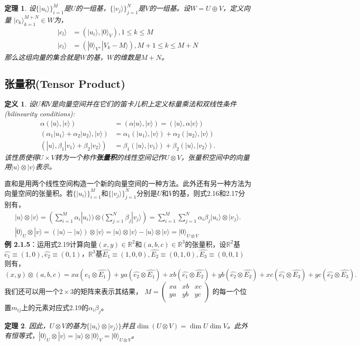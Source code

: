 \documentclass[mathserif,hyperref,UTF8,openany,b5paper]{ctexbook}
\newtheorem{defn}{定义}[section]
\newtheorem{thm}{定理}[section]
\begin{document}
\begin{thm}
设$\{|u_i\rangle\}^M_{i=1}$是$U$的一组基，$\{|v_j \rangle\}^N_{j=1}$是$V$的一组基。设$W = U\oplus V$，定义向量
${|c_k\rangle}^{M+N}_{k=1}\in W$为，
\begin{align}
    |c_l\rangle &= (|u_i\rangle,|0\rangle_V),1\leq k\leq M\\
    |c_l\rangle &= (|0\rangle_V,|V_k-M\rangle),M+1\leq k\leq M+N
\end{align}
那么这组向量的集合就是$W$的基，$W$的维数是$M + N$。
\end{thm}
\subsection{张量积(Tensor Product)}
\begin{defn}
设$U$和$V$是向量空间并在它们的笛卡儿积上定义标量乘法和双线性条件(bilinearity conditions):
\begin{align}
\alpha(|u\rangle,|v\rangle)&=(\alpha|u\rangle,|v\rangle)=(|u\rangle,\alpha|v\rangle)\\
(\alpha_1|u_1\rangle+\alpha_2|u_2\rangle,|v\rangle)&=\alpha_1(|u_1\rangle,|v\rangle)+\alpha_2(|u_2\rangle,|v\rangle)\\
(|u\rangle,\beta_1|v_1\rangle+\beta_2|v_2\rangle)&=\beta_1(|u\rangle,|v_1\rangle)+\beta_2(|u\rangle,
|v_2\rangle).
\end{align}
该性质使得$U\times V$转为一个称作\textbf{张量积}的线性空间记作$U\otimes V$，张量积空间中的向量用$|u\rangle \otimes |v \rangle$表示。
\end{defn}
直和是用两个线性空间构造一个新的向量空间的一种方法。此外还有另一种方法为向量空间的张量积。若$\{|u_i\rangle\}^M_{i=1}$和$\{|v_j\rangle\}^N_{j=1}$分别是$U$和$V$的基，则式2.16和2.17分别有，
\begin{align}
    |u\rangle \otimes |v \rangle = (\sum^M_{i=1}\alpha_i|u_i\rangle)\otimes(\sum^N_{j=1}\beta_j|v_j\rangle)=\sum^M_{i=1}\sum^N_{j=1}\alpha_i\beta_j|u_i\rangle\otimes|v_j\rangle.\\
    |0\rangle_U \otimes |v\rangle = (|u\rangle-|u\rangle)\otimes|v\rangle=|u\rangle\otimes|v\rangle-|u\rangle\otimes|v\rangle=|0\rangle_{U\otimes V}
\end{align}
\textbf{例 2.1.5}：运用式2.19计算向量$(x,y)\in\mathbb{R}^2$和$(a,b,c)\in\mathbb{R}^3$的张量积，设$\mathbb{R}^2$基$\hat{e_1}\equiv(1,0),\hat{e_2}\equiv(0,1)$，$\mathbb{R}^3$基$\hat{E_1}\equiv(1,0,0),\hat{E_2}\equiv(0,1,0),\hat{E_3}\equiv(0,0,1)$则有，
$(x,y)\otimes (a,b,c)=xa(\hat{e_1}\otimes\hat{E_1})+ya(\hat{e_2}\otimes\hat{E_1})+xb(\hat{e_1}\otimes\hat{E_2})+yb(\hat{e_2}\otimes\hat{E_2})+xc(\hat{e_1}\otimes\hat{E_3})+yc(\hat{e_2}\otimes\hat{E_3}).$
我们还可以用一个$2\times 3$的矩阵来表示其结果，
$M=\begin{pmatrix}
xa&xb&xc\\
ya&yb&yc\\
\end{pmatrix}$
的每一个位置$m_{ij}$上的元素对应式2.19的$\alpha_i\beta_j$。
\begin{thm}
因此，$U\otimes V$的基为$\{|u_i\rangle\otimes|v_j\rangle\}$并且$\dim (U\otimes V)=\dim U\dim V$。此外有恒等式，$|0\rangle_U \otimes |v\rangle =|u\rangle\otimes|0\rangle_V=|0\rangle_{U\otimes V}$。
\end{thm}
\end{document}
